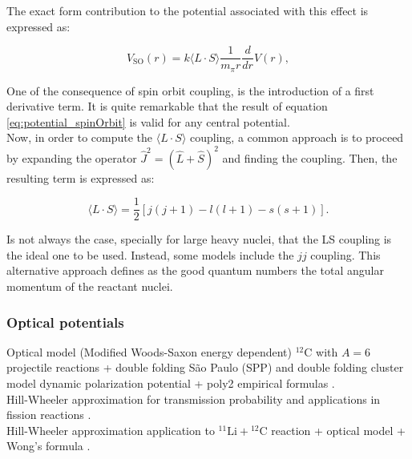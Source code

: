 \documentclass[openany]{book}
\begin{document}
The exact form contribution to the potential associated with this effect is expressed as:

\begin{equation}  \label{eq:potential_spinOrbit}
	V_{\mathrm{SO}}(r) = k\langle L \cdot S \rangle  \frac{1}{m_{\pi}r} \frac{d}{dr} V(r),
\end{equation}

One of the consequence of spin orbit coupling, is the introduction of a first derivative term. It is quite remarkable that the result of equation \ref{eq:potential_spinOrbit} is valid for any central potential.  \\

Now, in order to compute the   $  \langle L \cdot S \rangle$ coupling, a common approach is to proceed by expanding the operator  $\hat J^2 = (\hat L + \hat S)^2$ and finding the coupling. Then, the resulting term is expressed as: 

\begin{equation}  \label{eq:potential_spinOrbit_LSexpansion}
	\langle L \cdot S \rangle =  \frac{1}{2}[j(j+1) - l(l+1) - s(s+1)].
\end{equation}

Is not always the case, specially for large heavy nuclei, that the LS coupling is the ideal one to be used. Instead, some models include the $jj$ coupling. This alternative approach defines as the good quantum numbers the total angular momentum of the reactant nuclei.

\subsubsection{Optical potentials} \label{sub:potential_effective_optical}

Optical model (Modified Woods-Saxon energy dependent) $\mathrm{{}^{12}C}$ with $A = 6$ projectile reactions + double folding São Paulo (SPP)  and double folding cluster model dynamic polarization potential + poly2 empirical formulas \cite{amer_penionzhkevich_2021}. \\

Hill-Wheeler approximation for transmission probability and applications in fission reactions \cite{hill_wheeler_1953}. \\

Hill-Wheeler approximation  application to $\mathrm{{}^{11}Li + {}^{12}C}$ reaction + optical model + Wong's formula  \cite{esbensen_2012}. \\
 
\end{document}
